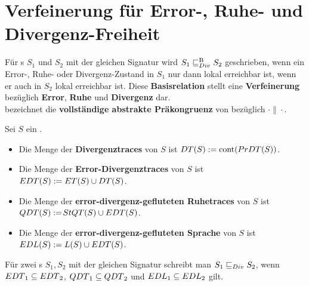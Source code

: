 \section{Verfeinerung für Error-, Ruhe- und Divergenz-Freiheit}
\begin{frame}
  \begin{Def}
    Für \EIO{}s $S_1$ und $S_2$ mit der gleichen Signatur wird $S_1\sqsubseteq _{Div}^\mathrm{B} S_2$
    geschrieben, wenn ein Error-, Ruhe- oder Divergenz-Zustand in $S_1$ nur
    dann lokal erreichbar ist, wenn er auch in $S_2$ lokal erreichbar ist. Diese
    \textbf{Basisrelation} stellt eine \textbf{Verfeinerung} bezüglich \textbf{Error},
    \textbf{Ruhe} und \textbf{Divergenz} dar.\\
    \DCRel{} bezeichnet die \textbf{vollständige abstrakte Präkongruenz} von \DBRel{}
    bezüglich $\cdot\|\cdot$.
  \end{Def}
\end{frame}

\begin{frame}
  \begin{Def}
    Sei $S$ ein \EIO{}.
    \begin{itemize}
      \item Die Menge der \textbf{Divergenztraces} von $S$ ist $DT{}(S) :=
        \mathrm{cont}{}(PrDT{}(S))$.
      \item Die Menge der \textbf{Error-Divergenztraces} von $S$ ist $EDT{}(S) :=
        ET{}(S)\cup DT{}(S)$.
      \item Die Menge der \textbf{error-divergenz-gefluteten Ruhetraces} von $S$
        ist $QDT{}(S) :=$\linebreak $StQT{}(S)\cup EDT{}(S)$.
      \item Die Menge der \textbf{error-divergenz-gefluteten Sprache} von $S$ ist
        $EDL{}(S) := L(S) \cup EDT{}(S)$.
    \end{itemize}
    Für zwei \EIO{}s $S_1, S_2$ mit der gleichen Signatur schreibt man $S_1\sqsubseteq _{Div}
    S_2$, wenn $EDT{}_1\subseteq EDT{}_2$, $QDT{}_1\subseteq QDT{}_2$ und
    $EDL{}_1\subseteq EDL{}_2$ gilt.
  \end{Def}
\end{frame}

